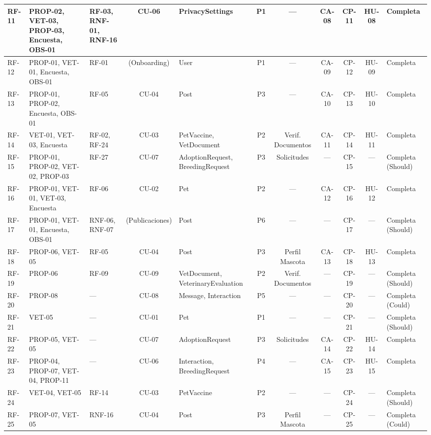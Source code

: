 \documentclass[journal,onecolumn]{IEEEtran}
\begin{document}
\begin{landscape}
\begin{table}[H]
\begin{tabularx}{\linewidth}{|l|X|X|c|X|c|c|c|c|c|X|}
				RF-11 & PROP-02, VET-03, PROP-03, Encuesta, OBS-01 & RF-03, RNF-01, RNF-16 & CU-06 & PrivacySettings & P1 & --- & CA-08 & CP-11 & HU-08 & Completa \\ \hline
				RF-12 & PROP-01, VET-01, Encuesta, OBS-01 & RF-01 & (Onboarding) & User & P1 & --- & CA-09 & CP-12 & HU-09 & Completa \\ \hline
				RF-13 & PROP-01, PROP-02, Encuesta, OBS-01 & RF-05 & CU-04 & Post & P3 & --- & CA-10 & CP-13 & HU-10 & Completa \\ \hline
				RF-14 & VET-01, VET-03, Encuesta & RF-02, RF-24 & CU-03 & PetVaccine, VetDocument & P2 & Verif. Documentos & CA-11 & CP-14 & HU-11 & Completa \\ \hline
				RF-15 & PROP-01, PROP-02, VET-02, PROP-03 & RF-27 & CU-07 & AdoptionRequest, BreedingRequest & P3 & Solicitudes & --- & CP-15 & --- & Completa (Should) \\ \hline
				RF-16 & PROP-01, VET-01, VET-03, Encuesta & RF-06 & CU-02 & Pet & P2 & --- & CA-12 & CP-16 & HU-12 & Completa \\ \hline
				RF-17 & PROP-01, VET-01, Encuesta, OBS-01 & RNF-06, RNF-07 & (Publicaciones) & Post & P6 & --- & --- & CP-17 & --- & Completa (Should) \\ \hline
				RF-18 & PROP-06, VET-05 & RF-05 & CU-04 & Post & P3 & Perfil Mascota & CA-13 & CP-18 & HU-13 & Completa \\ \hline
				RF-19 & PROP-06 & RF-09 & CU-09 & VetDocument, VeterinaryEvaluation & P2 & Verif. Documentos & --- & CP-19 & --- & Completa (Should) \\ \hline
				RF-20 & PROP-08 & --- & CU-08 & Message, Interaction & P5 & --- & --- & CP-20 & --- & Completa (Could) \\ \hline
				RF-21 & VET-05 & --- & CU-01 & Pet & P1 & --- & --- & CP-21 & --- & Completa (Should) \\ \hline
				RF-22 & PROP-05, VET-05 & --- & CU-07 & AdoptionRequest & P3 & Solicitudes & CA-14 & CP-22 & HU-14 & Completa \\ \hline
				RF-23 & PROP-04, PROP-07, VET-04, PROP-11 & --- & CU-06 & Interaction, BreedingRequest & P4 & --- & CA-15 & CP-23 & HU-15 & Completa \\ \hline
				RF-24 & VET-04, VET-05 & RF-14 & CU-03 & PetVaccine & P2 & --- & --- & CP-24 & --- & Completa (Should) \\ \hline
				RF-25 & PROP-07, VET-05 & RNF-16 & CU-04 & Post & P3 & Perfil Mascota & --- & CP-25 & --- & Completa (Could) \\ \hline

\end{tabularx}
\end{table}
\end{landscape}
\end{document}
